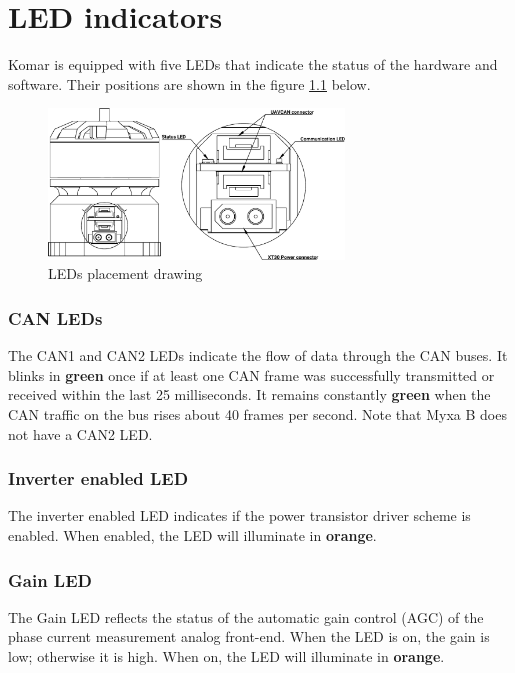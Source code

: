 
\chapter{LED indicators}

\newcommand{\LEDX}{{\rule{0.4em}{1.0em}}}
\newcommand{\LEDO}{{\rule{0.4em}{0.1em}}}

\newcommand{\ShowColor}[1]{{\color{#1}\rule{2em}{0.8em}}}

Komar is equipped with five LEDs that indicate the status of the hardware and software.
Their positions are shown in the figure \ref{fig:characteristics_leds_placement} below.

\begin{figure}[!hbt]
    \centering
    \includegraphics[width=0.7\textwidth]{figures/connectors_leds}
    \caption{LEDs placement drawing\label{fig:characteristics_leds_placement}}
\end{figure}

\subsection{CAN LEDs}
The CAN1 and CAN2 LEDs indicate the flow of data through the CAN buses. It blinks in \textbf{green} once if
at least one CAN frame was successfully transmitted or received within the last 25 milliseconds. It
remains constantly \textbf{green} when the CAN traffic on the bus rises about 40 frames per second. Note that
Myxa B does not have a CAN2 LED.

\subsection{Inverter enabled LED}
The inverter enabled LED indicates if the power transistor driver scheme is enabled. When enabled, the LED
will illuminate in \textbf{orange}.

\subsection{Gain LED}
The Gain LED reflects the status of the automatic gain control (AGC) of the phase current measurement analog
front-end. When the LED is on, the gain is low; otherwise it is high. When on, the LED will illuminate
in \textbf{orange}.

